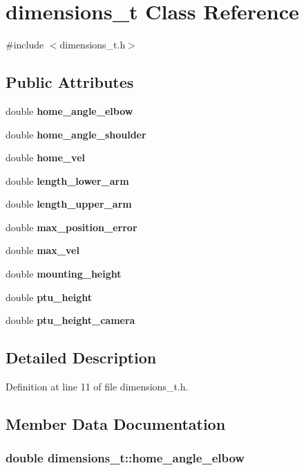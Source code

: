 \section{dimensions\-\_\-t \-Class \-Reference}
\label{classdimensions__t}


{\ttfamily \#include $<$dimensions\-\_\-t.\-h$>$}

\subsection*{\-Public \-Attributes}
\begin{DoxyCompactItemize}
\item 
double {\bf home\-\_\-angle\-\_\-elbow}
\item 
double {\bf home\-\_\-angle\-\_\-shoulder}
\item 
double {\bf home\-\_\-vel}
\item 
double {\bf length\-\_\-lower\-\_\-arm}
\item 
double {\bf length\-\_\-upper\-\_\-arm}
\item 
double {\bf max\-\_\-position\-\_\-error}
\item 
double {\bf max\-\_\-vel}
\item 
double {\bf mounting\-\_\-height}
\item 
double {\bf ptu\-\_\-height}
\item 
double {\bf ptu\-\_\-height\-\_\-camera}
\end{DoxyCompactItemize}


\subsection{\-Detailed \-Description}


\-Definition at line 11 of file dimensions\-\_\-t.\-h.



\subsection{\-Member \-Data \-Documentation}
\subsubsection[{home\-\_\-angle\-\_\-elbow}]{\setlength{\rightskip}{0pt plus 5cm}double {\bf dimensions\-\_\-t\-::home\-\_\-angle\-\_\-elbow}}\label{classdimensions__t_a3e86929105278e52d2c0658a6aa76536}


